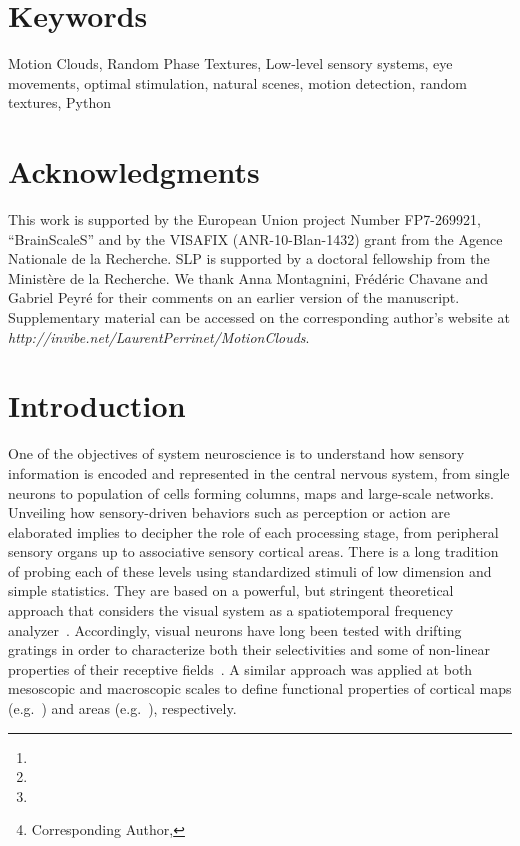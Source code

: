 \documentclass[a4paper,11pt]{article}%
\title{\Title}%
\author[1,2]{\AuthorA \thanks{\EmailA}}
\author[1,2]{\AuthorB \thanks{\EmailB}}
\author[1,2]{\AuthorC \thanks{\EmailC}}
\author[1,2]{\AuthorD \thanks{Corresponding Author, \EmailD}}%
\affil[1]{\AddressA}
\affil[2]{\AddressB}
\date{}%
\newcommand{\Website}{http://invibe.net/LaurentPerrinet}%
\newcommand{\Abstract}{%
Choosing an appropriate set of stimuli is essential in order to characterize the response of a sensory system to a particular functional dimension, such as the eye movement following the motion of a visual scene. %
Here, we describe a framework to generate random texture movies with controlled information content, i.e., Motion Clouds. These stimuli are defined using a generative model which is based on controlled experimental parametrization. %
We show that Motion Clouds correspond to dense mixing of localized moving gratings with random positions. Their global envelope is similar to natural-like stimulation with an approximate full-field translation corresponding to a retinal slip. %
We describe the construction of these stimuli mathematically and propose an open-source python-based implementation. %
Examples of the use of this framework are shown. We also propose extensions to other modalities such as color vision, touch and audition.%
}%
\newcommand{\Keywords}%
{Motion Clouds, Random Phase Textures, Low-level sensory systems, eye movements, optimal stimulation, natural scenes, motion detection, random textures, Python}
\newcommand{\Acknowledgments}{%
This work is supported by the European Union project Number FP7-269921, ``BrainScaleS'' and by the VISAFIX (ANR-10-Blan-1432)  grant from the Agence Nationale de la Recherche. SLP is supported by a doctoral fellowship from the Minist{\`e}re de la Recherche. We thank Anna Montagnini, Fr\'ed\'eric Chavane and Gabriel Peyr\'e for their comments on an earlier version of the manuscript. Supplementary material can be accessed on the corresponding author's website at \textit{\Website/MotionClouds}.}%
\begin{document}
\maketitle
\begin{abstract}
\Abstract
\end{abstract}%
\section*{Keywords}
\Keywords
\section*{Acknowledgments}
\Acknowledgments
\section{Introduction }\label{intro}

One of the objectives of system neuroscience is to understand how sensory information is encoded and represented in the central nervous system, from single neurons to population of cells forming columns, maps and large-scale networks. Unveiling how sensory-driven behaviors such as perception or action are elaborated implies to decipher the role of each processing stage, from peripheral sensory organs up to associative sensory cortical areas. There is a long tradition of probing each of these levels using standardized stimuli of low dimension and simple statistics. They are based on a powerful, but stringent theoretical approach that considers the visual system as a spatiotemporal frequency analyzer~\citep{Graham79,Watson83}. Accordingly, visual neurons have long been tested with drifting gratings in order to characterize both their selectivities and some of non-linear properties of their receptive fields~\citep{DeValois1988Spatial}. A similar approach was applied at both mesoscopic and macroscopic scales to define functional properties of cortical maps (e.g.~\citep{Blasdel86,TsO90}) and areas (e.g.~\citep{Singh2000Spatiotemporal,Henriksson08}), respectively.  
\end{document}
